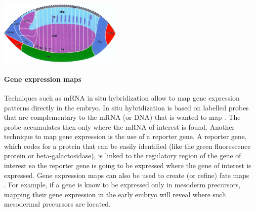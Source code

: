 \begin{mdframed}[style=boxstyle,frametitle={Box1. Fate maps and gene expression maps }]
\par
{\centering
  \includegraphics[width=0.45\textwidth]{./Images/blastoderm_fatemap_small.jpg}
  \centering
\label{fig:blastoderm_fatemap}
}
\par

\paragraph{Gene expression maps}

Techniques such as mRNA in situ hybridization allow to map gene expression patterns directly in the embryo. In situ hybridization is based on labelled probes that are complementary to the mRNA (or DNA) that is wanted to map \citep{Gall1969}. The probe accumulates then only where the mRNA of interest is found.
Another technique to map gene expression is the use of a reporter gene. A reporter gene, which codes for a protein that can be easily identified (like the green fluorescence protein or beta-galactosidase), is linked to the regulatory region of the gene of interest so the reporter gene is going to be expressed where the gene of interest is expressed.
Gene expression maps can also be used to create (or refine) fate maps \citep{gilbert2007fatemap}. 
For example, if a gene is know to be expressed only in mesoderm precursors, mapping their gene expression in the early embryo will reveal where such mesodermal precursors are located.


\end{mdframed}
